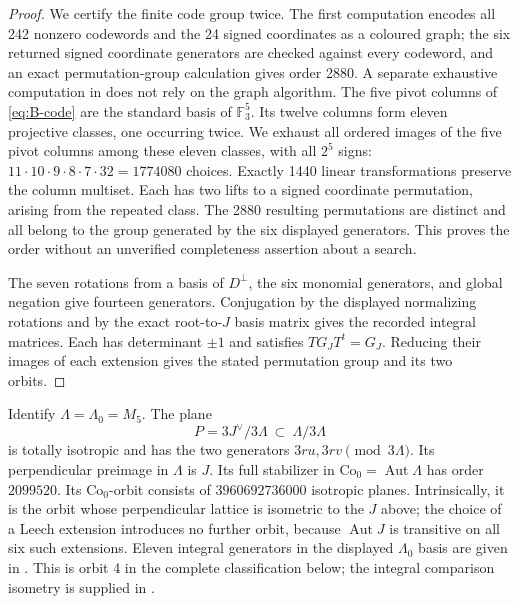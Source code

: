 \begin{proof}
We certify the finite code group twice. The first computation encodes
all 242 nonzero codewords and the 24 signed coordinates as a coloured
graph; the six returned signed coordinate generators are checked
against every codeword, and an exact permutation-group calculation
gives order 2880. A separate exhaustive computation in
 does not rely on the graph
algorithm. The five pivot columns of \eqref{eq:B-code} are the standard
basis of \(\mathbb F_3^5\). Its twelve columns form eleven projective
classes, one occurring twice. We exhaust all ordered images of the
five pivot columns among these eleven classes, with all \(2^5\) signs:
\(11\cdot10\cdot9\cdot8\cdot7\cdot32=1774080\) choices. Exactly
1440 linear transformations preserve the column multiset. Each has
two lifts to a signed coordinate permutation, arising from the repeated
class. The 2880 resulting permutations are distinct and all belong to
the group generated by the six displayed generators. This proves the
order without an unverified completeness assertion about a search.

The seven rotations from a basis of \(D^\perp\), the six monomial
generators, and global negation give fourteen generators. Conjugation
by the displayed normalizing rotations and by the exact root-to-\(J\)
basis matrix gives the recorded integral matrices. Each has determinant
\(\pm1\) and satisfies \(T G_JT^t=G_J\). Reducing their images of each
extension gives the stated permutation group and its two orbits.
\end{proof}

\begin{statement}
Identify \(\Lambda=\Lambda_0=M_5\). The plane
\[
 P=3J^\vee/3\Lambda\ \subset\ \Lambda/3\Lambda
\]
is totally isotropic and has the two generators \(3ru,3rv\pmod{3\Lambda}\).
Its perpendicular preimage in \(\Lambda\) is \(J\). Its full
stabilizer in \(\mathrm{Co}_0=\operatorname{Aut}\Lambda\) has order
\(2099520\). Its \(\mathrm{Co}_0\)-orbit consists of
\(3960692736000\) isotropic planes. Intrinsically, it is the orbit
whose perpendicular lattice is isometric to the \(J\) above; the
choice of a Leech extension introduces no further orbit, because
\(\operatorname{Aut}J\) is transitive on all six such extensions.
Eleven integral generators in the displayed \(\Lambda_0\) basis are
given in . This is orbit 4
in the complete classification below; the integral comparison
isometry is supplied in .
\end{statement}

